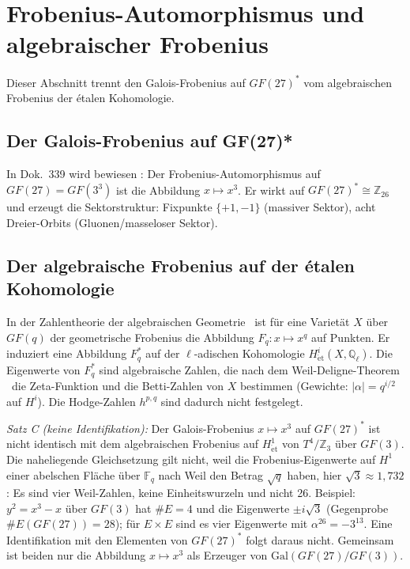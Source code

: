 \section{Frobenius-Automorphismus und algebraischer Frobenius}

Dieser Abschnitt trennt den Galois-Frobenius auf $GF(27)^*$ vom
algebraischen Frobenius der étalen Kohomologie.

\subsection{Der Galois-Frobenius auf GF(27)*}

In Dok.~339 wird bewiesen \BM: Der Frobenius-Automorphismus auf
$GF(27) = GF(3^3)$ ist die Abbildung $x \mapsto x^3$. Er wirkt auf
$GF(27)^* \cong \mathbb{Z}_{26}$ und erzeugt die Sektorstruktur:
Fixpunkte $\{+1,-1\}$ (massiver Sektor), acht Dreier-Orbits
(Gluonen/masseloser Sektor).

\subsection{Der algebraische Frobenius auf der étalen Kohomologie}

In der Zahlentheorie der algebraischen Geometrie \QM\ ist für eine Varietät
$X$ über $GF(q)$ der geometrische Frobenius die Abbildung
$F_q: x \mapsto x^q$ auf Punkten. Er induziert eine Abbildung
$F_q^*$ auf der $\ell$-adischen Kohomologie $H^i_{\mathrm{\acute{e}t}}(X,\mathbb{Q}_\ell)$.
Die Eigenwerte von $F_q^*$ sind algebraische Zahlen, die nach dem
Weil-Deligne-Theorem \EM\ die Zeta-Funktion und die Betti-Zahlen von $X$
bestimmen (Gewichte: $|\alpha| = q^{i/2}$ auf $H^i$). Die Hodge-Zahlen
$h^{p,q}$ sind dadurch nicht festgelegt.

\textit{Satz C (keine Identifikation):} Der Galois-Frobenius $x \mapsto x^3$
auf $GF(27)^*$ ist nicht identisch mit dem algebraischen Frobenius auf
$H^1_{\mathrm{\acute{e}t}}$ von $T^4/\mathbb{Z}_3$ über $GF(3)$. Die
naheliegende Gleichsetzung gilt nicht, weil die Frobenius-Eigenwerte auf $H^1$
einer abelschen Fläche über $\mathbb{F}_q$ nach Weil den Betrag $\sqrt{q}$
haben, hier $\sqrt{3} \approx 1{,}732$: Es sind vier Weil-Zahlen, keine
Einheitswurzeln und nicht 26. Beispiel: $y^2 = x^3 - x$ über $GF(3)$ hat
$\#E = 4$ und die Eigenwerte $\pm i\sqrt{3}$ (Gegenprobe $\#E(GF(27)) = 28$);
für $E\times E$ sind es vier Eigenwerte mit $\alpha^{26} = -3^{13}$. Eine
Identifikation mit den Elementen von $GF(27)^*$ folgt daraus nicht. Gemeinsam
ist beiden nur die Abbildung $x \mapsto x^3$ als Erzeuger von
$\mathrm{Gal}(GF(27)/GF(3))$.

